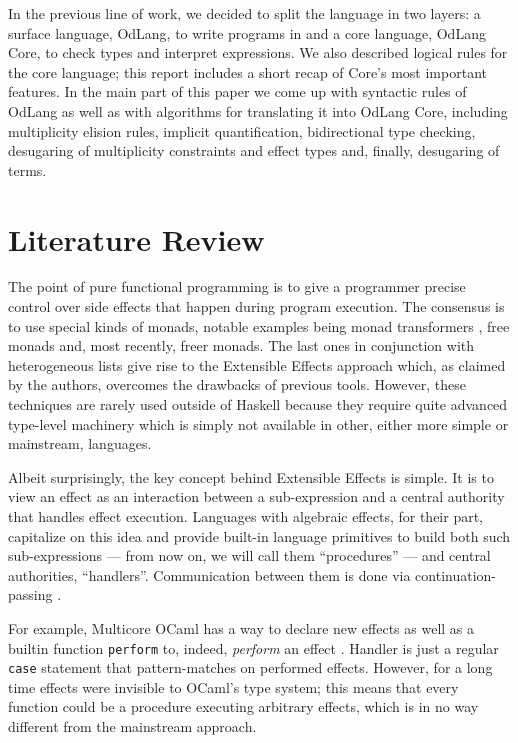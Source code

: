 \documentclass[a4paper,14pt]{extreport}
\begin{document}
In the previous line of work, we decided to split the language in two layers:
a surface language, OdLang, to write programs in and a core language, OdLang
Core, to check types and interpret expressions. We also described logical rules
for the core language; this report includes a short recap of Core's most
important features. In the main part of this paper we come up with syntactic
rules of OdLang as well as with algorithms for translating it into OdLang Core,
including multiplicity elision rules, implicit quantification, bidirectional
type checking, desugaring of multiplicity constraints and effect types and,
finally, desugaring of terms.

\chapter{Literature Review}

The point of pure functional programming is to give a programmer precise control
over side effects that happen during program execution. The consensus is to use
special kinds of monads, notable examples being monad transformers \cite{mtl},
free monads \cite{free} and, most recently, freer monads. The last ones in
conjunction with heterogeneous lists give rise to the Extensible Effects
approach \cite{exteff} which, as claimed by the authors, overcomes the drawbacks
of previous tools. However, these techniques are rarely used outside of Haskell
because they require quite advanced type-level machinery which is simply not
available in other, either more simple or mainstream, languages.

Albeit surprisingly, the key concept behind Extensible Effects is simple. It is
to view an effect as an interaction between a sub-expression and a central
authority that handles effect execution. Languages with algebraic effects, for
their part, capitalize on this idea and provide built-in language primitives to
build both such sub-expressions --- from now on, we will call them
``procedures'' --- and central authorities, ``handlers''. Communication between
them is done via continuation-passing \cite{algeff}.

For example, Multicore OCaml has a way to declare new effects as well as a
builtin function \verb|perform| to, indeed, \textit{perform} an effect
\cite{ocaml}. Handler is just a regular \verb|case| statement that
pattern-matches on performed effects. However, for a long time effects were
invisible to OCaml's type system; this means that every function could be a
procedure executing arbitrary effects, which is in no way different from
the mainstream approach.
\end{document}
